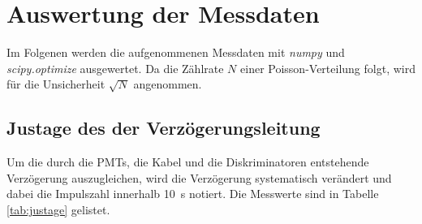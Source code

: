 \section{Auswertung der Messdaten}
\label{sec:Auswertung}
Im Folgenen werden die aufgenommenen Messdaten mit \textit{numpy} und \textit{scipy.optimize} ausgewertet. Da die Zählrate $N$ einer Poisson-Verteilung folgt, wird
für die Unsicherheit $\sqrt{N}$ angenommen. 

\subsection*{Justage des der Verzögerungsleitung}
Um die durch die PMTs, die Kabel und die Diskriminatoren entstehende Verzögerung auszugleichen, wird die Verzögerung systematisch verändert und dabei die Impulszahl innerhalb \SI{10}{\second} 
notiert. Die Messwerte sind in Tabelle \ref*{tab:justage} gelistet. 

